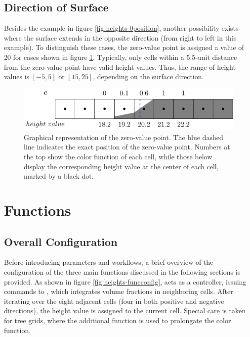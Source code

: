 \subsection{Direction of Surface}
Besides the example in figure \ref{fig:heights-0position}, another possibility exists where the surface extends in the opposite direction (from right to left in this example). To distinguish these cases, the zero-value point is assigned a value of $20$ for cases shown in figure \ref{fig:heights-direction}. Typically, only cells within a $5.5$-unit distance from the zero-value point have valid height values. Thus, the range of height values is $[-5,5]$ or $[15,25]$, depending on the surface direction.

\begin{figure}
    \centering
    \includegraphics{./image/heights-h/direction}
    \caption{Graphical representation of the zero-value point. The blue dashed line indicates the exact position of the zero-value point. Numbers at the top show the color function of each cell, while those below display the corresponding height value at the center of each cell, marked by a black dot.}
    \label{fig:heights-direction}
\end{figure}

\section{Functions}\label{sec:heights-funcc}
\subsection{Overall Configuration}\label{sec:heights-config}
Before introducing parameters and workflows, a brief overview of the configuration of the three main functions discussed in the following sections is provided. As shown in figure \ref{fig:heights-funcconfig},  acts as a controller, issuing commands to , which integrates volume fractions in neighboring cells. After iterating over the eight adjacent cells (four in both positive and negative directions), the height value is assigned to the current cell. Special care is taken for tree grids, where the additional function  is used to prolongate the color function.

